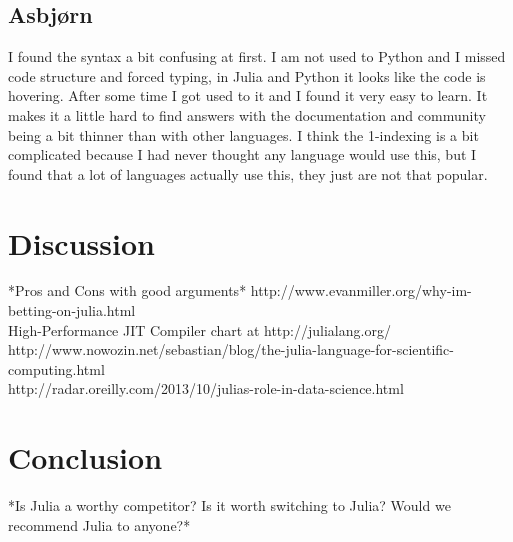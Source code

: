 \documentclass[a4paper, 11pt, titlepage]{article}
\begin{document}
\subsection{Asbjørn}
I found the syntax a bit confusing at first. I am not used to Python and I missed code structure and forced typing, in Julia and Python it looks like the code is hovering. After some time I got used to it and I found it very easy to learn. It makes it a little hard to find answers with the documentation and community being a bit thinner than with other languages. I think the 1-indexing is a bit complicated because I had never thought any language would use this, but I found that a lot of languages actually use this, they just are not that popular.

\section{Discussion}
*Pros and Cons with good arguments*
http://www.evanmiller.org/why-im-betting-on-julia.html \\
High-Performance JIT Compiler chart at http://julialang.org/ \\
http://www.nowozin.net/sebastian/blog/the-julia-language-for-scientific-computing.html \\
http://radar.oreilly.com/2013/10/julias-role-in-data-science.html \\

\section{Conclusion}
*Is Julia a worthy competitor? Is it worth switching to Julia? Would we recommend Julia to anyone?*
\end{document}
